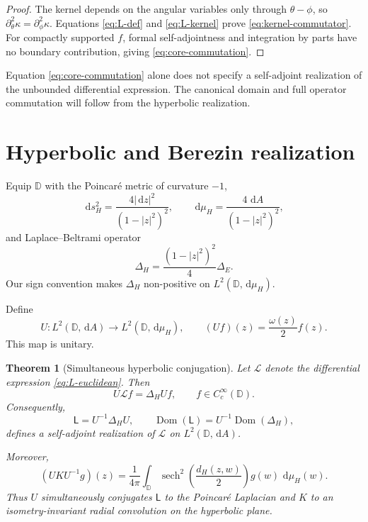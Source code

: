 \IfFileExists{iopjournal.cls}{\documentclass{iopjournal}}{\documentclass{iopjournal-draft}}
\newtheorem{theorem}{Theorem}[section]
\theoremstyle{definition}
\theoremstyle{remark}
\newcommand{\D}{\mathbb D}
\newcommand{\dd}{\,\mathrm d}
\newcommand{\sech}{\operatorname{sech}}
\numberwithin{equation}{section}
\begin{document}
\begin{proof}

The kernel depends on the angular variables only through $\theta-\phi$, so $\partial_\theta^2\kappa=\partial_\phi^2\kappa$.  Equations \eqref{eq:L-def} and \eqref{eq:L-kernel} prove \eqref{eq:kernel-commutator}.  For compactly supported $f$, formal self-adjointness and integration by parts have no boundary contribution, giving \eqref{eq:core-commutation}.
\end{proof}


Equation \eqref{eq:core-commutation} alone does not specify a self-adjoint realization of the unbounded differential expression.  The canonical domain and full operator commutation will follow from the hyperbolic realization.


\section{Hyperbolic and Berezin realization}
\label{sec:hyperbolic}

Equip $\D$ with the Poincar\'e metric of curvature $-1$,
\begin{equation}
 \dd s_H^2=\frac{4|\dd z|^2}{(1-|z|^2)^2},
 \qquad
 \dd\mu_H=\frac{4\,\dd A}{(1-|z|^2)^2},
 \label{eq:poincare-metric}
\end{equation}
and Laplace--Beltrami operator \cite{bergeron2016spectrum}
\begin{equation}
 \Delta_H=\frac{(1-|z|^2)^2}{4}\Delta_E.
 \label{eq:hyperbolic-laplacian}
\end{equation}
Our sign convention makes $\Delta_H$ non-positive on $L^2(\D,\dd\mu_H)$.

Define
\begin{equation}
 U:L^2(\D,\dd A)\longrightarrow L^2(\D,\dd\mu_H),
 \qquad
 (Uf)(z)=\frac{\omega(z)}{2}f(z).
 \label{eq:U}
\end{equation}
This map is unitary.
\begin{theorem}[Simultaneous hyperbolic conjugation]
	\label{thm:hyperbolic-conjugation}
	Let $\mathcal L$ denote the differential expression
	\eqref{eq:L-euclidean}.  Then
	\begin{equation}
		U\mathcal L f=\Delta_HUf,
		\qquad f\in C_c^\infty(\D).
		\label{eq:L-conjugation-core}
	\end{equation}
	Consequently,
	\begin{equation}
		\mathsf L=U^{-1}\Delta_HU,
		\qquad
		\operatorname{Dom}(\mathsf L)
		=
		U^{-1}\operatorname{Dom}(\Delta_H),
		\label{eq:L-operator}
	\end{equation}
	defines a self-adjoint realization of $\mathcal L$ on
	$L^2(\D,\dd A)$.
	
	Moreover,
	\begin{equation}
		(UKU^{-1}g)(z)
		=
		\frac1{4\pi}\int_{\D}
		\sech^2\!\left(\frac{d_H(z,w)}2\right)
		g(w)\,\dd\mu_H(w).
		\label{eq:hyperbolic-convolution}
	\end{equation}
	Thus $U$ simultaneously conjugates $\mathsf L$ to the Poincar\'e
	Laplacian and $K$ to an isometry-invariant radial convolution on the
	hyperbolic plane.
\end{theorem}
\end{document}
